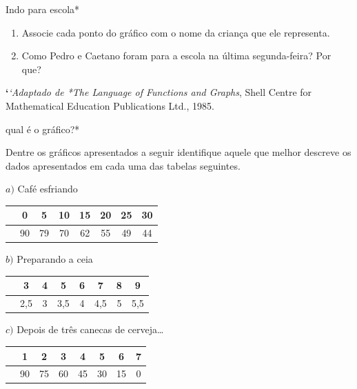 \begin{task}{ Indo para escola*}
\begin{enumerate}
\item {} 
Associe cada ponto do gráfico com o nome da criança que ele representa.

\item {} 
Como Pedro e Caetano foram para a escola na última segunda-feira? Por que?

\end{enumerate}

{\color{red}\bfseries{}{}`}\emph{{}`Adaptado de *The Language of Functions and Graphs}, Shell Centre for Mathematical Education Publications Ltd., 1985.

\end{task}

\begin{task}{ qual é o gráfico?*}
\label{\detokenize{AF106-5:ativ-qual-e-o-grafico}}\label{\detokenize{AF106-5:atividade-qual-e-o-grafico}}

Dentre os gráficos apresentados a seguir identifique aquele que melhor descreve os dados apresentados em cada uma das tabelas seguintes.


\(a)\) Café esfriando
\begin{table}[H]
\centering
\begin{tabu} to \textwidth{|c|c|c|c|c|c|c|c|}
\hline
{} & 0 & 5 & 10 & 15 & 20 & 25 & 30 \\
\hline
{} & 90 & 79 & 70 & 62 & 55 & 49 & 44\\
\hline
\end{tabu}
\end{table}

\(b)\) Preparando a ceia

\begin{table}[H]
\centering
\begin{tabu} to \textwidth{|c|c|c|c|c|c|c|c|}
\hline
{} & 3 & 4 & 5 & 6 & 7 & 8 & 9 \\
\hline
{} & 2,5 & 3 & 3,5 & 4 & 4,5 & 5 & 5,5\\
\hline
\end{tabu}
\end{table}

\(c)\) Depois de três canecas de cerveja…

\begin{table}[H]
\centering
\begin{tabu} to \textwidth{|c|c|c|c|c|c|c|c|}
\hline
{} & 1 & 2 & 3 & 4 & 5 & 6 & 7 \\
\hline
{} & 90 & 75 & 60 & 45 & 30 & 15 & 0 \\
\hline
\end{tabu}
\end{table}


\end{task}
